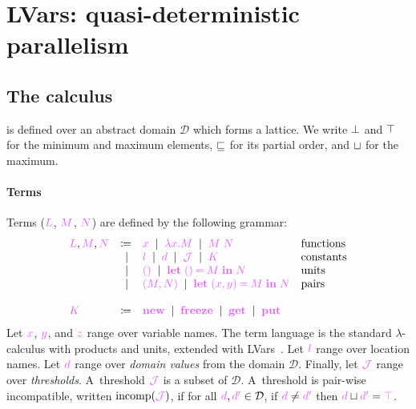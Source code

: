 \documentclass[main.tex]{subfiles}
\begin{document}
\section{LVars: quasi-deterministic parallelism}

\subsection{The \lambdalvar calculus}

\lambdalvar is defined over an abstract domain $\mathcal{D}$ which forms a lattice. We write ${\bot}$ and ${\top}$ for the minimum and maximum elements, $\mathbin{{\color{black}\sqsubseteq}}$ for its partial order, and $\mathbin{{\color{black}\sqcup}}$ for the maximum.

\paragraph*{Terms}
Terms ($\tm{L}$, $\tm{M}$, $\tm{N}$) are defined by the following grammar:
\[
  \begin{array}{lrll}
  \tm{L}, \tm{M}, \tm{N}
  & \coloneqq & \tm{x}
    \sep        \tm{\lambda x.M}
    \sep        \tm{M\;N}                     & \text{functions} \\
  & \sep      & \tm{l}                        
    \sep        \tm{d}
    \sep        \tmJ
    \sep        \tm{K}                        & \text{constants} \\
  & \sep      & \tm{\unit}                    
    \sep        \tm{\letunit{M}{N}}           & \text{units} \\
  & \sep      & \tm{\pair{M}{N}}              
    \sep        \tm{\letpair{x}{y}{M}{N}}     & \text{pairs}
  \\
  \\
  \tm{K}
  & \coloneqq & \tm{\lvarnew}
    \sep        \tm{\lvarfreeze}
    \sep        \tm{\lvarget}
    \sep        \tm{\lvarput}
\end{array}
\]
Let $\tm{x}$, $\tm{y}$, and $\tm{z}$ range over variable names. The term language is the standard $\lambda$-calculus with products and units, extended with LVars~\citep{kuper15}. Let $\tm{l}$ range over location names. Let $\tm{d}$ range over \emph{domain values} from the domain $\mathcal{D}$. Finally, let $\tmJ$ range over \emph{thresholds}. A~threshold $\tmJ$ is a subset of $\mathcal{D}$. A~threshold is pair-wise incompatible, written $\incomp(\tmJ)$, if for all $\tm{d},\tm{d'}\in\mathcal{D}$, if $\tm{d}\neq\tm{d'}$ then $\tm{d}\sqcup\tm{d'}=\tm{\topD}$.
\end{document}
